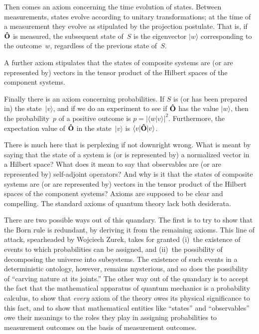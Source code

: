 \documentclass[smallextended]{svjour3}
\newcommand{\braket}[2]{\langle#1|#2\rangle}
\newcommand{\ket}[1]{|#1\rangle}
\newcommand{\hO}{{\bf\hat O}}
\newcommand{\sandwich}[3]{\langle#1\vert#2\vert#3\rangle}
\begin{document}
Then comes an axiom concerning the time evolution of states. Between measurements, states evolve according to unitary transformations; at the time of a measurement they evolve as stipulated by the projection postulate. That is, if $\hO$ is measured, the subsequent state of~$S$ is the eigenvector $\ket w$ corresponding to the outcome~$w$, regardless of the previous state of~$S$.

A further axiom stipulates that the states of composite systems are (or are represented by) vectors in the tensor product of the Hilbert spaces of the component systems.

Finally there is an axiom concerning probabilities. If $S$ is (or has been prepared in) the state~$\ket v$, and if we do an experiment to see if $\hO$ has the value $\ket w$, then the probability~$p$ of a positive outcome is $p=|\braket wv|^2$. Furthermore, the expectation value of $\hO$ in the state~$\ket v$ is $\sandwich v\hO v$.

There is much here that is perplexing if not downright wrong. What is meant by saying that the state of a system is (or is represented by) a normalized vector in a Hilbert space? What does it mean to say that observables are (or are represented by) self-adjoint operators? And why is it that the states of composite systems are (or are represented by) vectors in the tensor product of the Hilbert spaces of the component systems? Axioms are supposed to be clear and compelling. The standard axioms of quantum theory lack both desiderata.

There are two possible ways out of this quandary. The first is to try to show that the Born rule is redundant, by deriving it from the remaining axioms. This line of attack, spearheaded by Wojciech Zurek,\cite{Zurek2003a,Zurek2003b,Zurek2005envariance} takes for granted (i)~the existence of events to which probabilities can be assigned, and (ii)~the possibility of decomposing the universe into subsystems. The existence of such events in a deterministic ontology, however, remains mysterious, and so does the possibility of ``carving nature at its joints.'' The other way out of the quandary is to accept the fact that the mathematical apparatus of quantum mechanics is a probability calculus, to show that \textit{every} axiom of the theory owes its physical significance to this fact, and to show that mathematical entities like ``states'' and ``observables'' owe their meanings to the roles they play in assigning probabilities to measurement outcomes on the basis of measurement outcomes.
\end{document}
